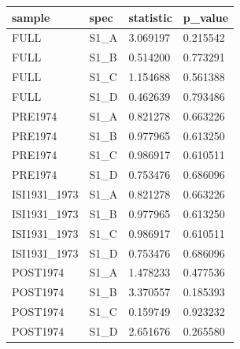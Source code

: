 \begin{tabular}{llll}
\hline
sample & spec & statistic & p\_value \\
\hline
FULL & S1\_A & 3.069197 & 0.215542 \\
FULL & S1\_B & 0.514200 & 0.773291 \\
FULL & S1\_C & 1.154688 & 0.561388 \\
FULL & S1\_D & 0.462639 & 0.793486 \\
PRE1974 & S1\_A & 0.821278 & 0.663226 \\
PRE1974 & S1\_B & 0.977965 & 0.613250 \\
PRE1974 & S1\_C & 0.986917 & 0.610511 \\
PRE1974 & S1\_D & 0.753476 & 0.686096 \\
ISI1931\_1973 & S1\_A & 0.821278 & 0.663226 \\
ISI1931\_1973 & S1\_B & 0.977965 & 0.613250 \\
ISI1931\_1973 & S1\_C & 0.986917 & 0.610511 \\
ISI1931\_1973 & S1\_D & 0.753476 & 0.686096 \\
POST1974 & S1\_A & 1.478233 & 0.477536 \\
POST1974 & S1\_B & 3.370557 & 0.185393 \\
POST1974 & S1\_C & 0.159749 & 0.923232 \\
POST1974 & S1\_D & 2.651676 & 0.265580 \\
\hline
\end{tabular}
